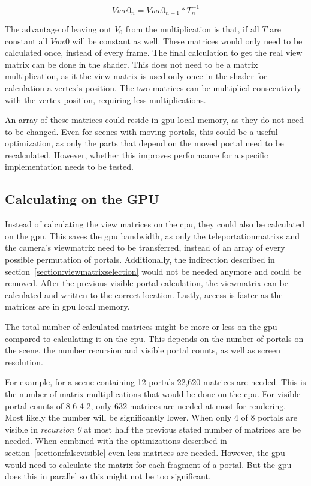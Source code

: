 $$Vwv0_n = Vwv0_{n-1} * T_n^{-1}$$

The advantage of leaving out $V_0$ from the multiplication is that, if all $T$ are constant all $Vwv0$ will be constant as well. These matrices would only need to be calculated once, instead of every frame. The final calculation to get the real view matrix can be done in the shader. This does not need to be a matrix multiplication, as it the view matrix is used only once in the shader for calculation a vertex's position. The two matrices can be multiplied consecutively with the vertex position, requiring less multiplications.

An array of these matrices could reside in \gls{gpu} local memory, as they do not need to be changed. Even for scenes with moving portals, this could be a useful optimization, as only the parts that depend on the moved portal need to be recalculated. However, whether this improves performance for a specific implementation needs to be tested.

\subsection{Calculating on the GPU}
Instead of calculating the view matrices on the \gls{cpu}, they could also be calculated on the \gls{gpu}.
This saves the \gls{gpu} bandwidth, as only the \glspl{teleportationmatrix}  and the camera's \gls{viewmatrix} need to be transferred, instead of an array of every possible permutation of portals. Additionally, the indirection described in section~\ref{section:viewmatrixselection} would not be needed anymore and could be removed. After the previous visible portal calculation, the \gls{viewmatrix} can be calculated and written to the correct location. Lastly, access is faster as the matrices are in \gls{gpu} local memory.

The total number of calculated matrices might be more or less on the \gls{gpu} compared to calculating it on the \gls{cpu}. This depends on the number of portals on the scene, the number recursion and visible portal counts, as well as screen resolution. 

For example, for a scene containing 12 portals 22,620 matrices are needed. This is the number of matrix multiplications that would be done on the \gls{cpu}. For visible portal counts of 8-6-4-2, only 632 matrices are needed at most for rendering. Most likely the number will be significantly lower. When only 4 of 8 portals are visible in \textit{recursion 0} at most half the previous stated number of matrices are be needed. When combined with the optimizations described in section~\ref{section:falsevisible} even less matrices are needed. However, the \gls{gpu} would need to calculate the matrix for each fragment of a portal. But the \gls{gpu} does this in parallel so this might not be too significant.

